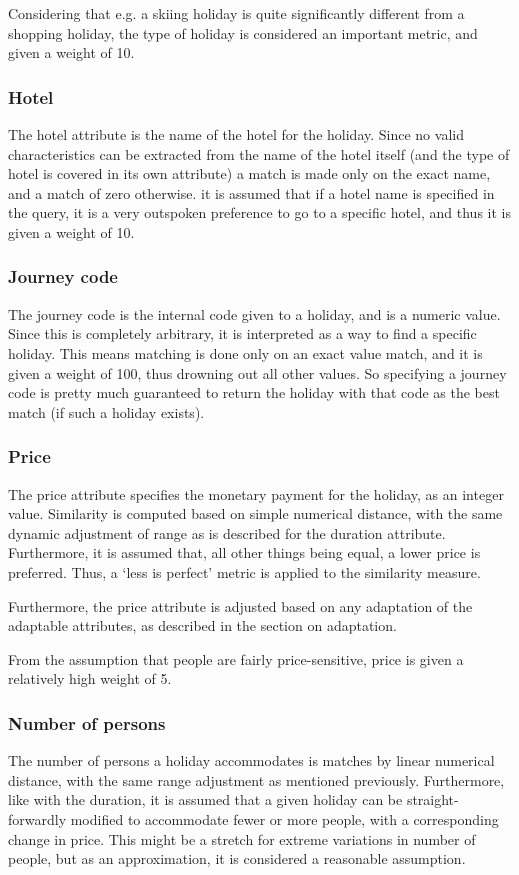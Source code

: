 \documentclass[a4paper,11pt]{scrartcl}
\begin{document}
Considering that e.g. a skiing holiday is quite significantly
different from a shopping holiday, the type of holiday is considered
an important metric, and given a weight of 10.

\subsubsection{Hotel}
The hotel attribute is the name of the hotel for the holiday. Since
no valid characteristics can be extracted from the name of the hotel
itself (and the type of hotel is covered in its own attribute) a match
is made only on the exact name, and a match of zero otherwise. it is
assumed that if a hotel name is specified in the query, it is a very
outspoken preference to go to a specific hotel, and thus it is given a
weight of 10.

\subsubsection{Journey code}
The journey code is the internal code given to a holiday, and is a
numeric value. Since this is completely arbitrary, it is interpreted
as a way to find a specific holiday. This means matching is done only
on an exact value match, and it is given a weight of 100, thus
drowning out all other values. So specifying a journey code is pretty
much guaranteed to return the holiday with that code as the best match
(if such a holiday exists).

\subsubsection{Price}
The price attribute specifies the monetary payment for the holiday, as
an integer value. Similarity is computed based on simple numerical
distance, with the same dynamic adjustment of range as is described
for the duration attribute. Furthermore, it is assumed that, all
other things being equal, a lower price is preferred. Thus, a `less is
perfect' metric is applied to the similarity measure.

Furthermore, the price attribute is adjusted based on any adaptation
of the adaptable attributes, as described in the section on
adaptation.

From the assumption that people are fairly price-sensitive, price is
given a relatively high weight of 5.

\subsubsection{Number of persons}
The number of persons a holiday accommodates is matches by linear
numerical distance, with the same range adjustment as mentioned
previously. Furthermore, like with the duration, it is assumed that a
given holiday can be straight-forwardly modified to accommodate fewer
or more people, with a corresponding change in price. This might be a
stretch for extreme variations in number of people, but as an
approximation, it is considered a reasonable assumption.
\end{document}
